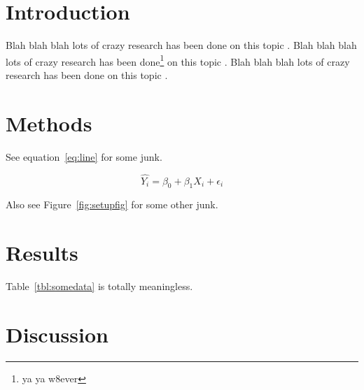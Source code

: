 \documentclass[letterpaper,12pt]{article}
\begin{document}
\lipsum[1]


\newpage
\section*{Introduction}

Blah blah blah lots of crazy research has been done on this topic \citep{Mattar:2005}. Blah blah blah lots of crazy research has been done\footnote{ya ya w8ever} on this topic \citep{Mattar:2005}. Blah blah blah lots of crazy research has been done on this topic \citep{Mattar:2005}. \lipsum[1]

\lipsum[1-3]


\section*{Methods}

\lipsum[1-2] See equation~\ref{eq:line} for some junk.

\begin{equation}
\hat{Y_{i}} = \beta_{0} + \beta_{1} X_{i} + \epsilon_{i}
\label{eq:line}
\end{equation}

Also see Figure~\ref{fig:setupfig} for some other junk.

\lipsum[1-3]


\section*{Results}

Table~\ref{tbl:somedata} is totally meaningless.
\lipsum[1-5]


\section*{Discussion}
\end{document}
